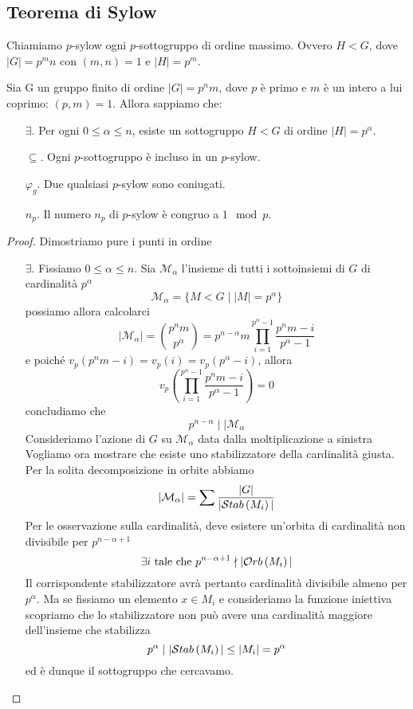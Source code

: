 \subsection{Teorema di Sylow}
\begin{multicols}{2}
	\begin{definition}
		Chiamiamo $ p $-sylow ogni $ p $-sottogruppo di ordine massimo. Ovvero $ H < G $, dove $ |G| = p^mn $ con $ (m, n) = 1 $ e $ |H| = p^m $.
	\end{definition}
\begin{theorem}[di Sylow]\label{sylow}
	Sia G un gruppo finito di ordine $ |G| = p^nm  $, dove $ p $ è primo e $ m $ è un intero a lui coprimo: $ (p, m) = 1 $. Allora sappiamo che:
	\begin{itemize}
		\item[$ \exists $.] Per ogni $ 0 \leq \alpha \leq n $, esiste un sottogruppo $ H<G $ di ordine $|H| = p^\alpha $.
		\item[$ \subseteq $.] Ogni $ p $-sottogruppo è incluso in un $ p $-sylow.
		\item[$ \varphi_g $.] Due qualsiasi $ p $-sylow sono coniugati.
		\item[$ n_p $.] Il numero $ n_p $ di $ p $-sylow è congruo a $ 1 \mod{p}$.
	\end{itemize}
\end{theorem}
\begin{proof}
		Dimostriamo pure i punti in ordine
	\begin{itemize}

		\item[$ \exists $.] Fissiamo $ 0 \leq \alpha \leq n $. Sia $ \mathcal{M}_\alpha $ l'insieme di tutti i sottoinsiemi di $ G $ di cardinalità $ p^\alpha $ \[ \mathcal{M}_\alpha = \{ M < G \mid |M| = p^\alpha \} \] possiamo allora calcolarci
		\[ |\mathcal{M}_\alpha| = {p^nm \choose p^\alpha} = p^{n-\alpha}m \prod_{i = 1}^{p^\alpha - 1}\frac{p^nm-i}{p^\alpha -1} \]
		e poiché $ v_p({p^nm-i}) = v_p(i) =  v_p({p^\alpha -i}) $, allora
		$$  v_p\left(\prod_{i = 1}^{p^\alpha - 1}\frac{p^nm-i}{p^\alpha -1}\right) =  0  $$
		concludiamo che
		\[ p^{n-\alpha} \mid\mid \mathcal{M}_\alpha \]
		Consideriamo l'azione di $ G $ su $ \mathcal{M}_\alpha $ data dalla moltiplicazione a sinistra
		Vogliamo ora mostrare che esiste uno stabilizzatore della cardinalità giusta. Per la solita decomposizione in orbite abbiamo
		\[ |\mathcal{M}_\alpha| = \sum \frac{|G|}{|\mathcal{S}tab\left( M_i \right)|} \]
		Per le osservazione sulla cardinalità, deve esistere un'orbita di cardinalità non divisibile per $ p^{n-\alpha +1} $
		\[ \exists i \text{ tale che }  p^{n-\alpha +1}\nmid |\mathcal{O}rb\left( M_i \right)| \]
		 Il corrispondente stabilizzatore avrà pertanto cardinalità divisibile almeno per $ p^\alpha $.
		 Ma se fissiamo un elemento $ x \in M_i $ e consideriamo la funzione iniettiva
		 scopriamo che lo stabilizzatore non può avere una cardinalità maggiore dell'insieme che stabilizza
		 \[ p^\alpha \mid |\mathcal{S}tab\left( M_i \right)| \leq |M_i| = p^\alpha \]
		 ed è dunque il sottogruppo che cercavamo.
		

\end{itemize}
\end{proof}
\end{multicols}
